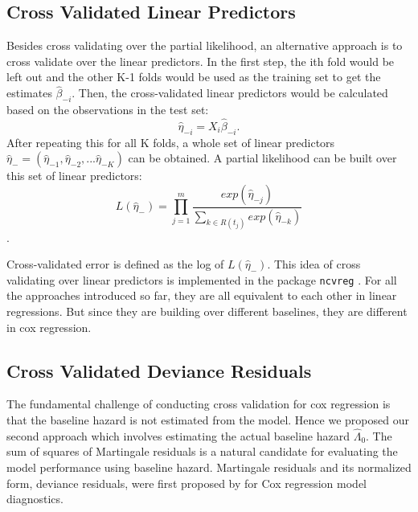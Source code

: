   \subsection{Cross Validated Linear Predictors}

Besides cross validating over the partial likelihood, an alternative approach is to cross validate over the linear predictors. In the first step, the ith fold would be left out and the other K-1 folds would be used as the training set to get the estimates $\hat{\beta}_{-i}$. Then, the cross-validated linear predictors would be calculated based on the observations in the test set:  \begin{equation}\hat{\eta}_{-i} = X_{i}\hat{\beta}_{-i}.\end{equation} After repeating this for all K folds, a whole set of linear predictors  $\hat{\eta}_{-} = ( \hat{\eta}_{-1},  \hat{\eta}_{-2} , ...  \hat{\eta}_{-K})$ can be obtained. A partial likelihood can be built over this set of linear predictors: \begin{equation} L(\hat{\eta}_{-}) = \prod_{j=1}^{m} \frac{exp (\hat{\eta}_{-j})}{\sum_{ k \in R(t_{j})}exp (\hat{\eta}_{-k})}\end{equation}.

Cross-validated error is defined as the log of $L(\hat{\eta}_{-})$. This idea of cross validating over linear predictors is implemented in the package \texttt{ncvreg} \citep{ncvreg}. For all the approaches introduced so far, they are all equivalent to each other in linear regressions. But since they are building over different baselines, they are different in cox regression.

    
  \subsection{Cross Validated Deviance Residuals}
The fundamental challenge of conducting cross validation for cox regression is that the baseline hazard is not estimated from the model. Hence we proposed our second approach which involves estimating the actual baseline hazard $\hat{\Lambda}_{0}$. The sum of squares of Martingale residuals is a natural candidate for evaluating the model performance using baseline hazard. Martingale residuals and its normalized form, deviance residuals, were first proposed by \citep{Therneau1990} for Cox regression model diagnostics. 

